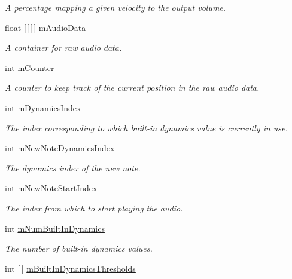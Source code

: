\begin{DoxyCompactItemize}
\begin{DoxyCompactList}\small\item\em A percentage mapping a given velocity to the output volume. \end{DoxyCompactList}\item 
float \mbox{[}$\,$\mbox{]}\mbox{[}$\,$\mbox{]} \hyperlink{group___n_o_o_priv_var_ga842eef5bfade070f914b8a551b3bcf43}{m\+Audio\+Data}
\begin{DoxyCompactList}\small\item\em A container for raw audio data. \end{DoxyCompactList}\item 
int \hyperlink{group___n_o_o_priv_var_ga5dca97be8d58837ace4ea6f4a972b20a}{m\+Counter}
\begin{DoxyCompactList}\small\item\em A counter to keep track of the current position in the raw audio data. \end{DoxyCompactList}\item 
int \hyperlink{group___n_o_o_priv_var_gaf0c9c2a90b5d73b8ffa0906bc69acdbc}{m\+Dynamics\+Index}
\begin{DoxyCompactList}\small\item\em The index corresponding to which built-\/in dynamics value is currently in use. \end{DoxyCompactList}\item 
int \hyperlink{group___n_o_o_priv_var_ga13de232048b35fc513f8aa3eeef65de0}{m\+New\+Note\+Dynamics\+Index}
\begin{DoxyCompactList}\small\item\em The dynamics index of the new note. \end{DoxyCompactList}\item 
int \hyperlink{group___n_o_o_priv_var_ga93720712088a4b6f91abe63d6f07a2c2}{m\+New\+Note\+Start\+Index}
\begin{DoxyCompactList}\small\item\em The index from which to start playing the audio. \end{DoxyCompactList}\item 
int \hyperlink{group___n_o_o_priv_var_ga3cc04564fcc1b1c4597af18e7e4fbc47}{m\+Num\+Built\+In\+Dynamics}
\begin{DoxyCompactList}\small\item\em The number of built-\/in dynamics values. \end{DoxyCompactList}\item 
int \mbox{[}$\,$\mbox{]} \hyperlink{group___n_o_o_priv_var_ga6a530f5e624caf8087c636df98d7f0b0}{m\+Built\+In\+Dynamics\+Thresholds}

\end{DoxyCompactItemize}
